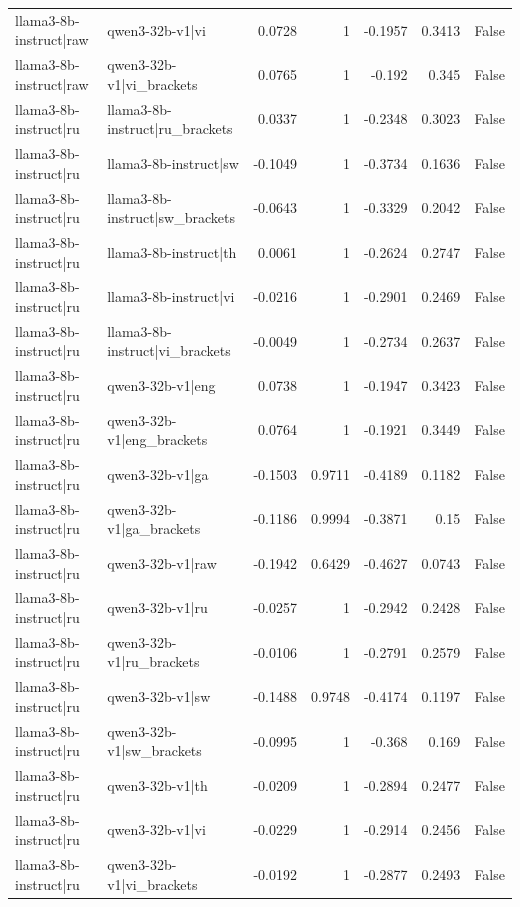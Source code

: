 \begin{table}
\begin{tabular}{l l r r r r l}
llama3-8b-instruct|raw & qwen3-32b-v1|vi & 0.0728 & 1 & -0.1957 & 0.3413 & False \\
llama3-8b-instruct|raw & qwen3-32b-v1|vi_brackets & 0.0765 & 1 & -0.192 & 0.345 & False \\
llama3-8b-instruct|ru & llama3-8b-instruct|ru_brackets & 0.0337 & 1 & -0.2348 & 0.3023 & False \\
llama3-8b-instruct|ru & llama3-8b-instruct|sw & -0.1049 & 1 & -0.3734 & 0.1636 & False \\
llama3-8b-instruct|ru & llama3-8b-instruct|sw_brackets & -0.0643 & 1 & -0.3329 & 0.2042 & False \\
llama3-8b-instruct|ru & llama3-8b-instruct|th & 0.0061 & 1 & -0.2624 & 0.2747 & False \\
llama3-8b-instruct|ru & llama3-8b-instruct|vi & -0.0216 & 1 & -0.2901 & 0.2469 & False \\
llama3-8b-instruct|ru & llama3-8b-instruct|vi_brackets & -0.0049 & 1 & -0.2734 & 0.2637 & False \\
llama3-8b-instruct|ru & qwen3-32b-v1|eng & 0.0738 & 1 & -0.1947 & 0.3423 & False \\
llama3-8b-instruct|ru & qwen3-32b-v1|eng_brackets & 0.0764 & 1 & -0.1921 & 0.3449 & False \\
llama3-8b-instruct|ru & qwen3-32b-v1|ga & -0.1503 & 0.9711 & -0.4189 & 0.1182 & False \\
llama3-8b-instruct|ru & qwen3-32b-v1|ga_brackets & -0.1186 & 0.9994 & -0.3871 & 0.15 & False \\
llama3-8b-instruct|ru & qwen3-32b-v1|raw & -0.1942 & 0.6429 & -0.4627 & 0.0743 & False \\
llama3-8b-instruct|ru & qwen3-32b-v1|ru & -0.0257 & 1 & -0.2942 & 0.2428 & False \\
llama3-8b-instruct|ru & qwen3-32b-v1|ru_brackets & -0.0106 & 1 & -0.2791 & 0.2579 & False \\
llama3-8b-instruct|ru & qwen3-32b-v1|sw & -0.1488 & 0.9748 & -0.4174 & 0.1197 & False \\
llama3-8b-instruct|ru & qwen3-32b-v1|sw_brackets & -0.0995 & 1 & -0.368 & 0.169 & False \\
llama3-8b-instruct|ru & qwen3-32b-v1|th & -0.0209 & 1 & -0.2894 & 0.2477 & False \\
llama3-8b-instruct|ru & qwen3-32b-v1|vi & -0.0229 & 1 & -0.2914 & 0.2456 & False \\
llama3-8b-instruct|ru & qwen3-32b-v1|vi_brackets & -0.0192 & 1 & -0.2877 & 0.2493 & False \\

\end{tabular}
\end{table}
